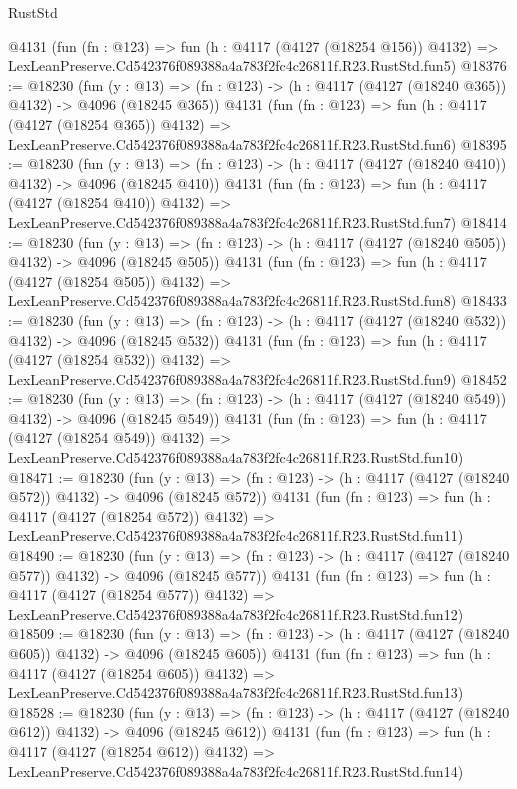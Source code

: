 \begin{lexlean}{RustStd}
\begin{coremodule}
    @4131
    (fun (fn : @123) =>
    fun (h : @4117 (@4127 (@18254 @156)) @4132) =>
    LexLeanPreserve.Cd542376f089388a4a783f2fc4c26811f.R23.RustStd.fun5)
@18376 := @18230
    (fun (y : @13) => (fn : @123) -> (h : @4117 (@4127 (@18240 @365)) @4132) -> @4096 (@18245 @365))
    @4131
    (fun (fn : @123) =>
    fun (h : @4117 (@4127 (@18254 @365)) @4132) =>
    LexLeanPreserve.Cd542376f089388a4a783f2fc4c26811f.R23.RustStd.fun6)
@18395 := @18230
    (fun (y : @13) => (fn : @123) -> (h : @4117 (@4127 (@18240 @410)) @4132) -> @4096 (@18245 @410))
    @4131
    (fun (fn : @123) =>
    fun (h : @4117 (@4127 (@18254 @410)) @4132) =>
    LexLeanPreserve.Cd542376f089388a4a783f2fc4c26811f.R23.RustStd.fun7)
@18414 := @18230
    (fun (y : @13) => (fn : @123) -> (h : @4117 (@4127 (@18240 @505)) @4132) -> @4096 (@18245 @505))
    @4131
    (fun (fn : @123) =>
    fun (h : @4117 (@4127 (@18254 @505)) @4132) =>
    LexLeanPreserve.Cd542376f089388a4a783f2fc4c26811f.R23.RustStd.fun8)
@18433 := @18230
    (fun (y : @13) => (fn : @123) -> (h : @4117 (@4127 (@18240 @532)) @4132) -> @4096 (@18245 @532))
    @4131
    (fun (fn : @123) =>
    fun (h : @4117 (@4127 (@18254 @532)) @4132) =>
    LexLeanPreserve.Cd542376f089388a4a783f2fc4c26811f.R23.RustStd.fun9)
@18452 := @18230
    (fun (y : @13) => (fn : @123) -> (h : @4117 (@4127 (@18240 @549)) @4132) -> @4096 (@18245 @549))
    @4131
    (fun (fn : @123) =>
    fun (h : @4117 (@4127 (@18254 @549)) @4132) =>
    LexLeanPreserve.Cd542376f089388a4a783f2fc4c26811f.R23.RustStd.fun10)
@18471 := @18230
    (fun (y : @13) => (fn : @123) -> (h : @4117 (@4127 (@18240 @572)) @4132) -> @4096 (@18245 @572))
    @4131
    (fun (fn : @123) =>
    fun (h : @4117 (@4127 (@18254 @572)) @4132) =>
    LexLeanPreserve.Cd542376f089388a4a783f2fc4c26811f.R23.RustStd.fun11)
@18490 := @18230
    (fun (y : @13) => (fn : @123) -> (h : @4117 (@4127 (@18240 @577)) @4132) -> @4096 (@18245 @577))
    @4131
    (fun (fn : @123) =>
    fun (h : @4117 (@4127 (@18254 @577)) @4132) =>
    LexLeanPreserve.Cd542376f089388a4a783f2fc4c26811f.R23.RustStd.fun12)
@18509 := @18230
    (fun (y : @13) => (fn : @123) -> (h : @4117 (@4127 (@18240 @605)) @4132) -> @4096 (@18245 @605))
    @4131
    (fun (fn : @123) =>
    fun (h : @4117 (@4127 (@18254 @605)) @4132) =>
    LexLeanPreserve.Cd542376f089388a4a783f2fc4c26811f.R23.RustStd.fun13)
@18528 := @18230
    (fun (y : @13) => (fn : @123) -> (h : @4117 (@4127 (@18240 @612)) @4132) -> @4096 (@18245 @612))
    @4131
    (fun (fn : @123) =>
    fun (h : @4117 (@4127 (@18254 @612)) @4132) =>
    LexLeanPreserve.Cd542376f089388a4a783f2fc4c26811f.R23.RustStd.fun14)

\end{coremodule}
\end{lexlean}

